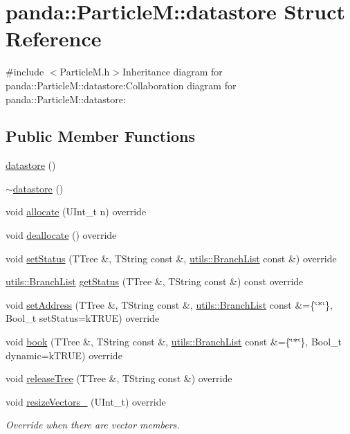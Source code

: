 \hypertarget{structpanda_1_1ParticleM_1_1datastore}{
\section{panda::ParticleM::datastore Struct Reference}
\label{structpanda_1_1ParticleM_1_1datastore}
}


{\ttfamily \#include $<$ParticleM.h$>$}Inheritance diagram for panda::ParticleM::datastore:Collaboration diagram for panda::ParticleM::datastore:\subsection*{Public Member Functions}
\begin{DoxyCompactItemize}
\item 
\hyperlink{structpanda_1_1ParticleM_1_1datastore_acc9af307e2c4fee9bc5d9bbb37ad6124}{datastore} ()
\item 
\hyperlink{structpanda_1_1ParticleM_1_1datastore_ae068980c20730bc8565d2f7ea701bc5e}{$\sim$datastore} ()
\item 
void \hyperlink{structpanda_1_1ParticleM_1_1datastore_aafc17a88cf8425ff45a00b5fd2eb5751}{allocate} (UInt\_\-t n) override
\item 
void \hyperlink{structpanda_1_1ParticleM_1_1datastore_a85c4ce11f1d7c6944a525ad2488880aa}{deallocate} () override
\item 
void \hyperlink{structpanda_1_1ParticleM_1_1datastore_a0329bec2c84d16ff16e15824890e7a86}{setStatus} (TTree \&, TString const \&, \hyperlink{classpanda_1_1utils_1_1BranchList}{utils::BranchList} const \&) override
\item 
\hyperlink{classpanda_1_1utils_1_1BranchList}{utils::BranchList} \hyperlink{structpanda_1_1ParticleM_1_1datastore_a4069b8cdca5715ed6faf0a7907ea8386}{getStatus} (TTree \&, TString const \&) const override
\item 
void \hyperlink{structpanda_1_1ParticleM_1_1datastore_ab9f9e7afb145c12941baa10892ed1811}{setAddress} (TTree \&, TString const \&, \hyperlink{classpanda_1_1utils_1_1BranchList}{utils::BranchList} const \&=\{\char`\"{}$\ast$\char`\"{}\}, Bool\_\-t setStatus=kTRUE) override
\item 
void \hyperlink{structpanda_1_1ParticleM_1_1datastore_ae2eb76ca042d8b3e899c027ee07b5860}{book} (TTree \&, TString const \&, \hyperlink{classpanda_1_1utils_1_1BranchList}{utils::BranchList} const \&=\{\char`\"{}$\ast$\char`\"{}\}, Bool\_\-t dynamic=kTRUE) override
\item 
void \hyperlink{structpanda_1_1ParticleM_1_1datastore_ad6986990fa55f1c6ca4e92db28486922}{releaseTree} (TTree \&, TString const \&) override
\item 
void \hyperlink{structpanda_1_1ParticleM_1_1datastore_a6dd61d4a8f70e81a1638757a5edbc7ed}{resizeVectors\_\-} (UInt\_\-t) override
\begin{DoxyCompactList}\small\item\em Override when there are vector members. \item\end{DoxyCompactList}\end{DoxyCompactItemize}


